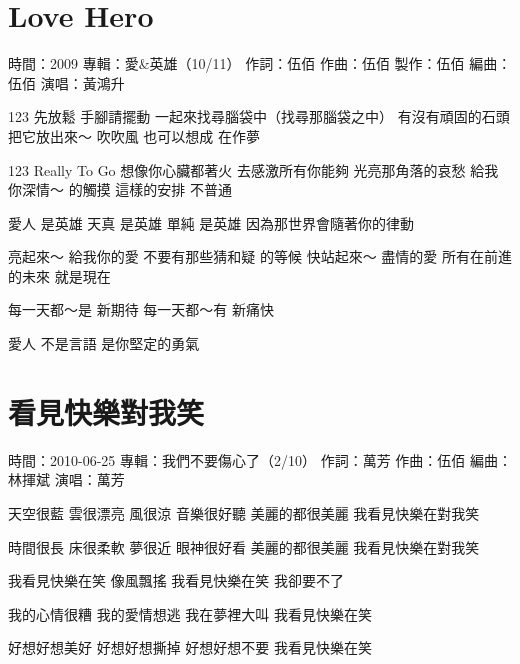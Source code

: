 \documentclass[UTF8,a4paper,oneside,twocolumn,12pt]{ctexbook}
\newcommand{\infopair}[2]{\textbullet #1：#2}
\newcommand{\zc}[1][伍佰]{\infopair{作詞}{#1}}
\newcommand{\zq}[1][伍佰]{\infopair{作曲}{#1}}
\newcommand{\bq}[1][伍佰]{\infopair{編曲}{#1}}
\newcommand{\zj}[1]{\infopair{專輯}{#1}}
\newcommand{\zz}[1]{\infopair{製作}{#1}}
\newcommand{\sj}[1]{\infopair{時間}{#1}}
\newenvironment{info}{\begin{flushleft}\kaishu
	}
	{\end{flushleft}\normalsize\yahei\par}
\newenvironment{lyric}{
	}
{}
\begin{document}
\section{Love Hero}
\begin{info}
	\sj{2009}
	\zj{愛\&英雄（10/11）}
	\zc
	\zq
	\zz{伍佰}
	\bq[伍佰]
	\infopair{演唱}{黃鴻升}
\end{info}
\begin{lyric}
	123 先放鬆 手腳請擺動
	一起來找尋腦袋中（找尋那腦袋之中） 有沒有頑固的石頭
	把它放出來～ 吹吹風
	也可以想成 在作夢

	123 Really To Go 想像你心臟都著火
	去感激所有你能夠 光亮那角落的哀愁
	給我你深情～ 的觸摸
	這樣的安排 不普通

	愛人 是英雄 天真 是英雄 單純 是英雄
	因為那世界會隨著你的律動

	亮起來～ 給我你的愛
	不要有那些猜和疑 的等候
	快站起來～ 盡情的愛
	所有在前進的未來 就是現在

	每一天都～是 新期待
	每一天都～有 新痛快

	愛人 不是言語 是你堅定的勇氣
\end{lyric}

\section{看見快樂對我笑}
\begin{info}
	\sj{2010-06-25}
	\zj{我們不要傷心了（2/10）}
	\zc[萬芳]
	\zq
	\bq[林揮斌]
	\infopair{演唱}{萬芳}
\end{info}
\begin{lyric}
	天空很藍    雲很漂亮
	風很涼    音樂很好聽
	美麗的都很美麗
	我看見快樂在對我笑

	時間很長    床很柔軟
	夢很近    眼神很好看
	美麗的都很美麗
	我看見快樂在對我笑

	我看見快樂在笑
	像風飄搖
	我看見快樂在笑
	我卻要不了

	我的心情很糟  我的愛情想逃
	我在夢裡大叫  我看見快樂在笑

	好想好想美好  好想好想撕掉
	好想好想不要  我看見快樂在笑
\end{lyric}
\end{document}
